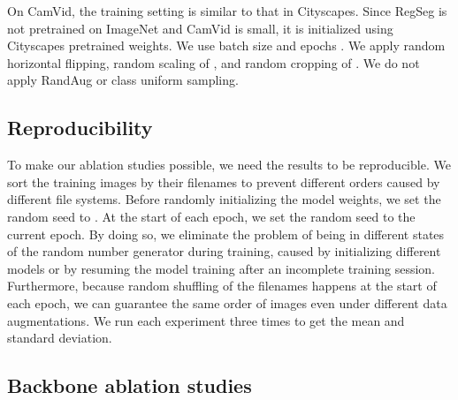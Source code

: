\documentclass[10pt,twocolumn,letterpaper]{article}
\begin{document}
On CamVid, the training setting is similar to that in Cityscapes. Since RegSeg is not pretrained on ImageNet and CamVid is small, it is initialized using Cityscapes pretrained weights. We use batch size  and epochs . We apply random horizontal flipping, random scaling of , and random cropping of . We do not apply RandAug or class uniform sampling.

\subsection{Reproducibility}

To make our ablation studies possible, we need the results to be reproducible. We sort the training images by their filenames to prevent different orders caused by different file systems. Before randomly initializing the model weights, we set the random seed to . At the start of each epoch, we set the random seed to the current epoch. By doing so, we eliminate the problem of being in different states of the random number generator during training, caused by initializing different models or by resuming the model training after an incomplete training session. Furthermore, because random shuffling of the filenames happens at the start of each epoch, we can guarantee the same order of images even under different data augmentations. We run each experiment three times to get the mean and standard deviation. 

\subsection{Backbone ablation studies}
\label{sec:backboneAblation}




\begin{table}
  \centering
  \caption{The dilation rates found using differentiable neural architecture search. This method achieves comparable accuracy to the manually searched results in \cref{fig:miou_vs_fov}}
  \label{tab:dnas}
\end{table}
\end{document}
